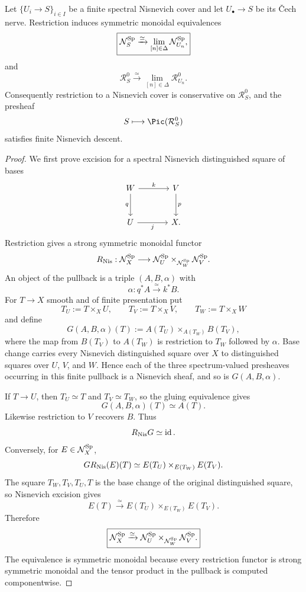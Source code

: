 \begin{theorem}
\label{thm:bn-diff-thom-stable-descent}
Let \(\{U_i\to S\}_{i\in I}\) be a finite spectral Nisnevich cover and let
\(U_\bullet\to S\) be its \v{C}ech nerve.  Restriction induces symmetric
monoidal equivalences
\[
  \boxed{
  \mathcal N_S^{\mathrm{Sp}}
  \xrightarrow{\simeq}
  \operatorname*{lim}_{[n]\in\Delta}\mathcal N_{U_n}^{\mathrm{Sp}},
  }
\]
and
\[
  \boxed{
  \mathcal R_S^0
  \xrightarrow{\simeq}
  \lim_{[n]\in\Delta}\mathcal R_{U_n}^0.
  }
\]
Consequently restriction to a Nisnevich cover is conservative on
\(\mathcal R_S^0\), and the presheaf
\[
  S\longmapsto\Pic(\mathcal R_S^0)
\]
satisfies finite Nisnevich descent.
\end{theorem}

\begin{proof}
We first prove excision for a spectral Nisnevich distinguished square of bases
\[
\begin{tikzcd}[column sep=large,row sep=large]
W \ar[r,"k"] \ar[d,"q"'] & V \ar[d,"p"]\\
U \ar[r,"j"'] & X.
\end{tikzcd}
\]
Restriction gives a strong symmetric monoidal functor
\[
    R_{\mathrm{Nis}}:
    \mathcal N_X^{\mathrm{Sp}}
    \longrightarrow
    \mathcal N_U^{\mathrm{Sp}}
    \times_{\mathcal N_W^{\mathrm{Sp}}}
    \mathcal N_V^{\mathrm{Sp}}.
\]
An object of the pullback is a triple $(A,B,\alpha)$ with
\[
    \alpha:q^*A\xrightarrow{\simeq}k^*B.
\]
For $T\to X$ smooth and of finite presentation put
\[
    T_U:=T\times_XU,
    \qquad
    T_V:=T\times_XV,
    \qquad
    T_W:=T\times_XW
\]
and define
\[
    G(A,B,\alpha)(T)
    :=
    A(T_U)
    \times_{A(T_W)}
    B(T_V),
\]
where the map from $B(T_V)$ to $A(T_W)$ is restriction to $T_W$ followed by
$\alpha$.  Base change carries every Nisnevich distinguished square over $X$
to distinguished squares over $U$, $V$, and $W$.  Hence each of the three
spectrum-valued presheaves occurring in this finite pullback is a Nisnevich
sheaf, and so is $G(A,B,\alpha)$.

If $T\to U$, then $T_U\simeq T$ and $T_V\simeq T_W$, so the gluing
equivalence gives
\[
    G(A,B,\alpha)(T)\simeq A(T).
\]
Likewise restriction to $V$ recovers $B$.  Thus
\[
    R_{\mathrm{Nis}}G\simeq\operatorname{id}.
\]
Conversely, for $E\in\mathcal N_X^{\mathrm{Sp}}$,
\[
    GR_{\mathrm{Nis}}(E)(T)
    \simeq
    E(T_U)\times_{E(T_W)}E(T_V).
\]
The square $T_W,T_V,T_U,T$ is the base change of the original distinguished
square, so Nisnevich excision gives
\[
    E(T)\xrightarrow{\simeq}
    E(T_U)\times_{E(T_W)}E(T_V).
\]
Therefore
\[
    \boxed{
    \mathcal N_X^{\mathrm{Sp}}
    \xrightarrow{\simeq}
    \mathcal N_U^{\mathrm{Sp}}
    \times_{\mathcal N_W^{\mathrm{Sp}}}
    \mathcal N_V^{\mathrm{Sp}}.
    }
\]
The equivalence is symmetric monoidal because every restriction functor is
strong symmetric monoidal and the tensor product in the pullback is computed
componentwise.


\end{proof}
